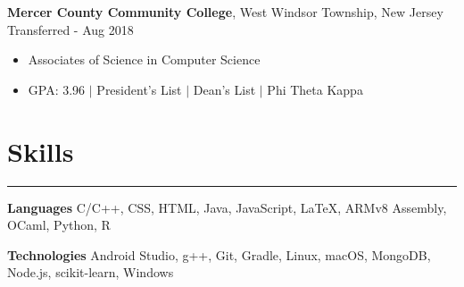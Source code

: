\documentclass[10pt]{article}
\newcommand{\resumesection}[1]{\vspace{-0.2cm}\section*{#1}\vspace{-0.2cm}\hrule\vspace{0.2cm}}
\begin{document}
\textbf{Mercer County Community College}, West Windsor Township, New Jersey \hfill Transferred - Aug 2018
\begin{itemize}
	\item[] Associates of Science in Computer Science
	\item[] GPA: 3.96 $\vert$ President's List $\vert$ Dean's List $\vert$ Phi Theta Kappa
\end{itemize}


\resumesection{Skills}
\textbf{Languages} C/C++, CSS, HTML, Java, JavaScript, \LaTeX, ARMv8 Assembly, OCaml, Python, R


\textbf{Technologies} Android Studio, g++, Git, Gradle, Linux, macOS, MongoDB, Node.js, scikit-learn, Windows


%


\end{document}
